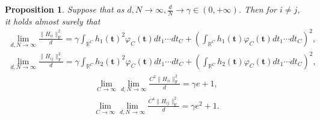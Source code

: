 \documentclass{article}
\newcommand{\mb}{\mathbb}
\newcommand\mf{\mathbf}
\newcommand{\rw}{\rightarrow}
\newcommand{\1}{^{(1)}}
\newcommand{\2}{^{(2)}}
\renewcommand{\l}{\left}
\renewcommand{\r}{\right}
\newtheorem{prop}{Proposition}
\newcommand{\bea}{\begin{equation}\begin{aligned}}
\newcommand{\eea}{\end{aligned}\end{equation}}
\begin{document}
\begin{prop}
\label{thm3appendix}
    Suppose that as $d,N\rw\infty, \frac
    {d}{N}\rw \gamma\in (0,+\infty)$. Then for $i\ne j$, it holds almost surely that
        \bea\label{eq1thm3appendix}
        \lim_{d,N\rw \infty}\frac{\|H_{ii}\|_{\operatorname{F}}^2}{d} =\gamma\int_{\mb{R}^C}h_1(\mf{t})^2\varphi_C(\mf{t})dt_1\cdots dt_C + \l(\int_{\mb{R}^C}h_1(\mf{t})\varphi_C(\mf{t})dt_1\cdots dt_C\r)^2,
        \eea
        \bea\label{eq2thm3appendix}
        \lim_{d,N\rw \infty}\frac{\|H_{ij}\|_{\operatorname{F}}^2}{d} =\gamma\int_{\mb{R}^C}h_2(\mf{t})^2\varphi_C(\mf{t})dt_1\cdots dt_C + \l(\int_{\mb{R}^C}h_2(\mf{t})\varphi_C(\mf{t})dt_1\cdots dt_C\r)^2,
        \eea
        \bea\label{eq3thm3appendix}
\lim_{C\rw\infty}\lim_{d,N\rw\infty}\frac{C^2\|H_{ii}\|_{\operatorname{F}}^2}{d}=\gamma e+1,
        \eea
        \bea\label{eq4thm3appendix}
\lim_{C\rw\infty}\lim_{d,N\rw\infty}\frac{C^4\|H_{ij}\|_{\operatorname{F}}^2}{d}=\gamma e^2+1.
        \eea
\end{prop}
\end{document}
